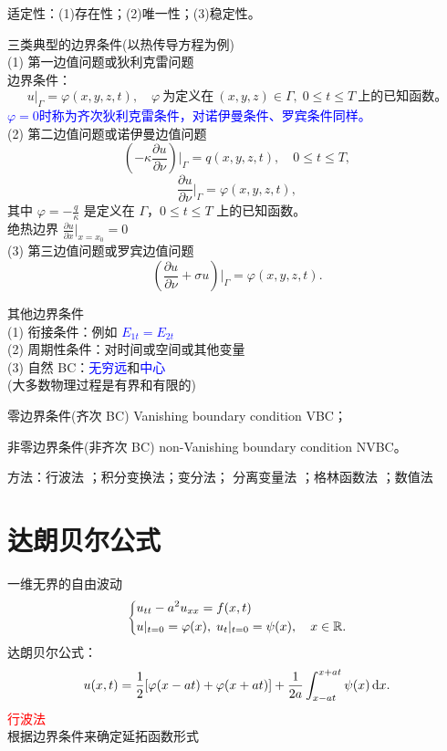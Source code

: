 \documentclass[12pt, a4paper, oneside, UTF8]{ctexbook}
\begin{document}
适定性：(1)存在性；(2)唯一性；(3)稳定性。

\noindent 三类典型的边界条件(以热传导方程为例)  \\
(1) 第一边值问题或狄利克雷问题  \\
边界条件：
 \[ u|_\varGamma = \varphi(x,y,z,t),\quad \varphi\ \mbox{为定义在}\ (x,y,z)\in \varGamma,\;
0\leqslant t \leqslant T\ \mbox{上的已知函数。} \]
\textcolor{blue}{$\varphi=0$时称为齐次狄利克雷条件，对诺伊曼条件、罗宾条件同样。}  \\
(2) 第二边值问题或诺伊曼边值问题
\[ (-\kappa \frac{\partial{u}}{\partial{\nu}})|_\varGamma = q(x,y,z,t),\quad 0\leqslant t \leqslant T,\]
\[ \frac{\partial{u}}{\partial{\nu}}|_\varGamma = \varphi(x,y,z,t),\] 
其中 $\varphi=-\frac{q}{\kappa}$ 是定义在 $\varGamma$，$0 \leqslant t \leqslant T$ 上的已知函数。  \\
 绝热边界 $ \frac{\partial{u}}{\partial{x}}|_{x=x_0} = 0 $  \\
(3) 第三边值问题或罗宾边值问题
\[ (\frac{\partial{u}}{\partial{\nu}}+\sigma u)|_\varGamma = \varphi(x,y,z,t). \]

\noindent 其他边界条件  \\
(1) 衔接条件：例如 \textcolor{blue}{$E_{1t}=E_{2t}$}  \\
(2) 周期性条件：对时间或空间或其他变量  \\
(3) 自然 BC：\textcolor{blue}{无穷远}和\textcolor{blue}{中心}  \\
(大多数物理过程是有界和有限的)

零边界条件(齐次 BC) Vanishing boundary condition VBC；

非零边界条件(非齐次 BC) non-Vanishing boundary condition NVBC。

方法：行波法 ；积分变换法；变分法；
分离变量法 ；格林函数法 ；数值法

\section{达朗贝尔公式}

一维无界的自由波动
\begin{equation}
    \left\{ 
    \begin{lgathered}
        u_{tt} - a^2u_{xx} = f(x,t)  \\
        u|_{t = 0} = \varphi(x),\;u_{t}|_{t = 0} = \psi(x),\quad x \in \Rs.
    \end{lgathered}   
    \right.
\end{equation}
达朗贝尔公式：
\begin{equation}
    u(x,t) = \frac{1}{2}[\varphi(x - at) + \varphi(x + at)] 
            + \frac{1}{2a}\int_{x - at}^{x + at} \psi(x) \mathop{}\!\mathrm{d} x.
    \label{eq:达朗贝尔公式}
\end{equation}
\textcolor{red}{行波法}  \\
 根据边界条件来确定延拓函数形式


\ifx\allfiles\undefined
\end{document}
